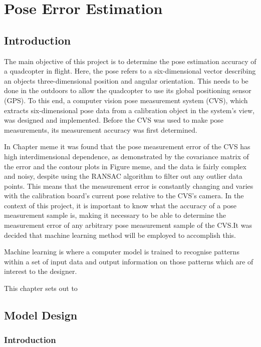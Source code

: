 \chapter{Pose Error Estimation}

\section{Introduction}

The main objective of this project is to determine the pose estimation accuracy of a quadcopter in flight. Here, the pose refers to a six-dimensional vector describing an objects three-dimensional position and angular orientation. This needs to be done in the outdoors to allow the quadcopter to use its global positioning sensor (GPS). To this end, a computer vision pose measurement system (CVS), which extracts six-dimensional pose data from a calibration object in the system's view, was designed and implemented. Before the CVS was used to make pose measurements, its measurement accuracy was first determined. 

In Chapter meme it was found that the pose measurement error of the CVS has high interdimensional dependence, as demonstrated by the covariance matrix of the error and the contour plots in Figure meme, and the data is fairly complex and noisy, despite using the RANSAC algorithm to filter out any outlier data points. This means that the measurement error is constantly changing and varies with the calibration board's current pose relative to the CVS's camera. In the context of this project, it is important to know what the accuracy of a pose measurement sample is, making it necessary to be able to determine the measurement error of any arbitrary pose measurement sample of the CVS.\@ It was decided that machine learning method will be employed to accomplish this. 

Machine learning is where a computer model is trained to recognise patterns within a set of input data and output information on those patterns which are of interest to the designer. 

This chapter sets out to 

\section{Model Design}

\subsection{Introduction}

